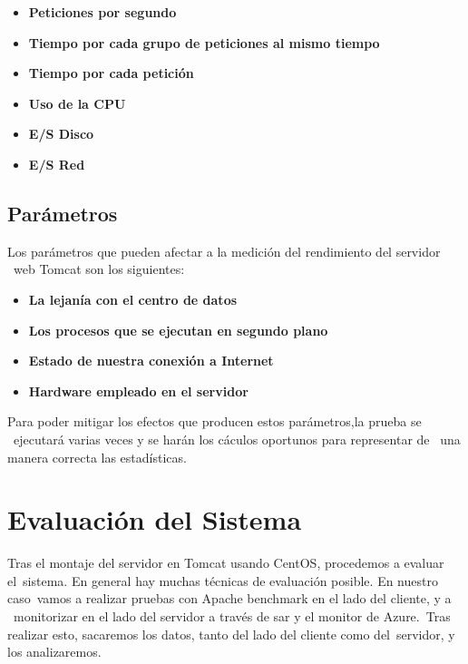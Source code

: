 \documentclass[11pt,twoside,a4paper]{book}
\begin{document}
\begin{itemize}
  \item \textbf{Peticiones por segundo}
  \item \textbf{Tiempo por cada grupo de peticiones al mismo tiempo}
  \item \textbf{Tiempo por cada petición}
  \item \textbf{Uso de la CPU}
  \item \textbf{E/S Disco}
  \item \textbf{E/S Red}
\end{itemize}

\pagebreak
\section{Parámetros}
Los parámetros que pueden afectar a la medición del rendimiento del servidor \
web Tomcat son los siguientes:

\begin{itemize}
  \item \textbf{La lejanía con el centro de datos}
  \item \textbf{Los procesos que se ejecutan en segundo plano}
  \item \textbf{Estado de nuestra conexión a Internet}
  \item \textbf{Hardware empleado en el servidor}
\end{itemize}

Para poder mitigar los efectos que producen estos parámetros,la prueba se \
ejecutará varias veces y se harán los cáculos oportunos para representar de \
una manera correcta las estadísticas.

\chapter{Evaluación del Sistema}
Tras el montaje del servidor en Tomcat usando CentOS, procedemos a evaluar el\
sistema. En general hay muchas técnicas de evaluación posible. En nuestro caso\
vamos a realizar pruebas con Apache benchmark en el lado del cliente, y a \
monitorizar en el lado del servidor a través de sar y el monitor de Azure.\
Tras realizar esto, sacaremos los datos, tanto del lado del cliente como del\
servidor, y los analizaremos.
\end{document}
